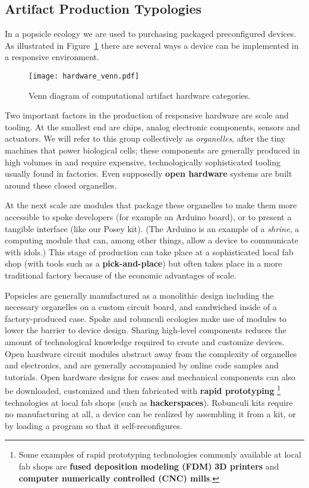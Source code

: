\subsection{Artifact Production Typologies}
%
In a popsicle ecology we are used to purchasing packaged preconfigured devices. As illustrated in Figure~\ref{fig:hardware_venn} there are several ways a device can be implemented in a responsive environment. 

\begin{figure}[b!]
  \centering
    \texttt{[image: hardware\_venn.pdf]}
  \caption{Venn diagram of computational artifact hardware categories.}
  \label{fig:hardware_venn}
\end{figure}

Two important factors in the production of responsive hardware are scale and tooling. 
At the smallest end are chips, analog electronic components, sensors and actuators. 
We will refer to this group collectively as \emph{organelles}, after the tiny machines that power biological cells; these components are generally produced in high volumes in and require expensive, technologically sophisticated tooling usually found in factories. 
Even supposedly \textbf{open hardware} systems are built around these closed organelles. 

At the next scale are modules that package these organelles to make them more accessible to spoke developers (for example an Arduino board), or to present a tangible interface (like our Posey kit). 
(The Arduino is an example of a \emph{shrine}, a computing module that can, among other things, allow a device to communicate with idols.) 
This stage of production can take place at a sophisticated local fab shop (with tools such as a \textbf{pick-and-place}) but often takes place in a more traditional factory because of the economic advantages of scale.

Popsicles are generally manufactured as a monolithic design including the necessary organelles on a custom circuit board, and sandwiched inside of a factory-produced case. 
Spoke and robunculi ecologies make use of modules to lower the barrier to device design. 
Sharing high-level components reduces the amount of technological knowledge required to create and customize devices.
Open hardware circuit modules abstract away from the complexity of organelles and electronics, and are generally accompanied by online code samples and tutorials. 
Open hardware designs for cases and mechanical components can also be downloaded, customized and then fabricated with \textbf{rapid prototyping}%
\footnote{Some examples of rapid prototyping technologies commonly available at local fab shops are \textbf{fused deposition modeling (FDM)} \textbf{3D printers} and \textbf{computer numerically controlled (CNC) mills}.}
technologies at local fab shops (such as \textbf{hackerspaces}).
Robunculi kits require no manufacturing at all, a device can be realized by assembling it from a kit, or by loading a program so that it self-reconfigures.

